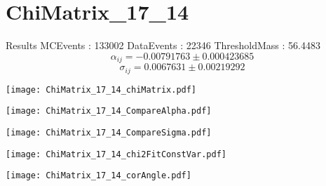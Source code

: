 \documentclass[a4paper,12pt]{article}
\begin{document}
\section{ChiMatrix\_17\_14}
\begin{minipage}{0.49\linewidth} Results \newline
MCEvents : 133002\newline
DataEvents : 22346 \newline
ThresholdMass : 56.4483\\
$$\alpha_{ij} = -0.00791763\pm 0.000423685$$
$$\sigma_{ij} = 0.0067631\pm 0.00219292$$
\end{minipage}\hfill
\begin{minipage}{0.49\linewidth} 
\texttt{[image: ChiMatrix\_17\_14\_chiMatrix.pdf]}\\
\end{minipage}
\hfill
\begin{minipage}{0.49\linewidth} 
\texttt{[image: ChiMatrix\_17\_14\_CompareAlpha.pdf]}\\
\end{minipage}
\hfill
\begin{minipage}{0.49\linewidth} 
\texttt{[image: ChiMatrix\_17\_14\_CompareSigma.pdf]}\\
\end{minipage}
\begin{minipage}{0.49\linewidth} 
\texttt{[image: ChiMatrix\_17\_14\_chi2FitConstVar.pdf]}\\
\end{minipage}
\hfill
\begin{minipage}{0.49\linewidth} 
\texttt{[image: ChiMatrix\_17\_14\_corAngle.pdf]}\\
\end{minipage}
\end{document}

